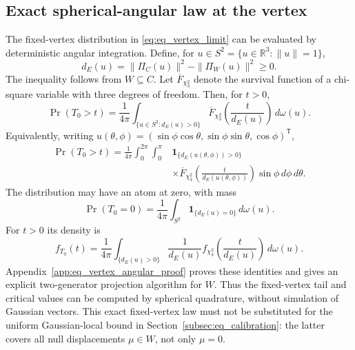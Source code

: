 \subsection{Exact spherical-angular law at the vertex}
\label{subsec:eq_vertex_angular}
The fixed-vertex distribution in \eqref{eq:eq_vertex_limit}
can be evaluated by deterministic angular integration. Define,
for $u\in S^2=\{u\in\mathbb R^3:\|u\|=1\}$,
\begin{equation}\label{eq:eq_vertex_angular_function}
 d_E(u)=\|\Pi_C(u)\|^2-\|\Pi_W(u)\|^2\ge0.
\end{equation}
The inequality follows from $W\subseteq C$.
Let $\overline F_{\chi_3^2}$ denote the survival function
of a chi-square variable with three degrees of freedom.
Then, for $t>0$,
\begin{equation}\label{eq:eq_vertex_angular_tail}
 \boxed{\displaystyle
 \Pr(T_0>t)=\frac{1}{4\pi}
 \int_{\{u\in S^2:d_E(u)>0\}}
 \overline F_{\chi_3^2}\!\left(\frac{t}{d_E(u)}\right)
 \,d\omega(u).}
\end{equation}
Equivalently, writing
$u(\theta,\phi)=(\sin\phi\cos\theta,
\sin\phi\sin\theta,\cos\phi)^{\mathsf T}$,
\begin{equation}\label{eq:eq_vertex_spherical_tail}
\begin{aligned}
 \Pr(T_0>t)=\frac{1}{4\pi}
 \int_0^{2\pi}\!\int_0^\pi
 &\mathbf1_{\{d_E(u(\theta,\phi))>0\}}\\
 &\times\overline F_{\chi_3^2}\!\left(
 \frac{t}{d_E(u(\theta,\phi))}\right)
 \sin\phi\,d\phi\,d\theta.
\end{aligned}
\end{equation}
The distribution may have an atom at zero, with mass
\begin{equation}\label{eq:eq_vertex_atom}
 \Pr(T_0=0)=\frac{1}{4\pi}
 \int_{S^2}\mathbf1_{\{d_E(u)=0\}}\,d\omega(u).
\end{equation}
For $t>0$ its density is
\begin{equation}\label{eq:eq_vertex_density}
 f_{T_0}(t)=\frac{1}{4\pi}
 \int_{\{d_E(u)>0\}}
 \frac{1}{d_E(u)}
 f_{\chi_3^2}\!\left(\frac{t}{d_E(u)}\right)
 \,d\omega(u).
\end{equation}
Appendix~\ref{app:eq_vertex_angular_proof} proves these
identities and gives an explicit two-generator projection
algorithm for $W$. Thus the fixed-vertex tail and critical
values can be computed by spherical quadrature, without
simulation of Gaussian vectors. This exact fixed-vertex law
must not be substituted for the uniform Gaussian-local bound
in Section~\ref{subsec:eq_calibration}: the latter covers
all null displacements $\mu\in W$, not only $\mu=0$.

